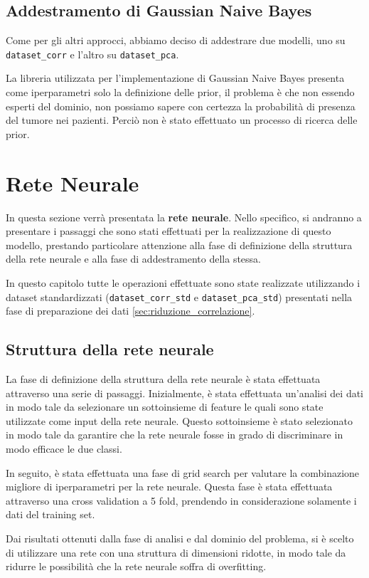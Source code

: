 \subsection{Addestramento di Gaussian Naive Bayes}
Come per gli altri approcci, abbiamo deciso di addestrare due modelli, uno su
\texttt{dataset\_corr} e l'altro su \texttt{dataset\_pca}.

La libreria utilizzata per l'implementazione di Gaussian Naive Bayes
presenta come iperparametri solo la definizione delle prior, il problema è che non
essendo esperti del dominio, non possiamo sapere con certezza la probabilità
di presenza del tumore nei pazienti. Perciò non è stato effettuato un processo di
ricerca delle prior.
\section{Rete Neurale}
In questa sezione verrà presentata la \textbf{rete neurale}. Nello specifico, si
andranno a presentare i passaggi che sono stati effettuati per la realizzazione
di questo modello, prestando particolare attenzione alla fase di definizione
della struttura della rete neurale e alla fase di addestramento della stessa.

In questo capitolo tutte le operazioni effettuate sono state realizzate
utilizzando i dataset standardizzati (\texttt{dataset\_corr\_std} e
\texttt{dataset\_pca\_std}) presentati nella fase di preparazione dei
dati \ref{sec:riduzione_correlazione}.
\subsection{Struttura della rete neurale}
La fase di definizione della struttura della rete neurale è stata effettuata
attraverso una serie di passaggi. Inizialmente, è stata effettuata un'analisi
dei dati in modo tale da selezionare un sottoinsieme di feature le quali sono
state utilizzate come input della rete neurale. Questo sottoinsieme è stato
selezionato in modo tale da garantire che la rete neurale fosse in grado di
discriminare in modo efficace le due classi.

In seguito, è stata effettuata una fase di grid search per valutare la combinazione
migliore di iperparametri per la rete neurale. Questa fase è stata effettuata
attraverso una cross validation a 5 fold, prendendo in considerazione solamente
i dati del training set.

Dai risultati ottenuti dalla fase di analisi e dal dominio del problema, si è
scelto di utilizzare una rete con una struttura di dimensioni ridotte, in modo
tale da ridurre le possibilità che la rete neurale soffra di overfitting.

